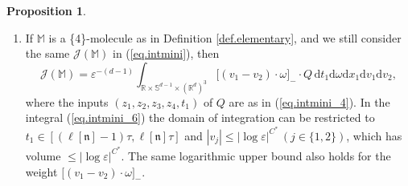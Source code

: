 \documentclass[10pt, reqno]{amsart}
\newcommand{\Mb}{\mathbb M}
\newcommand{\Rb}{\mathbb R}
\newcommand{\Sb}{\mathbb S}
\newcommand{\Tb}{\mathbb T}
\newcommand {\Jc}{\mathcal J}
\newcommand{\nf}{\mathfrak n}
\theoremstyle{definition}
\newtheorem{proposition}[theorem]{Proposition}
\theoremstyle{remark}
\numberwithin{equation}{section}
\begin{document}
\begin{proposition}
\begin{enumerate}
In addition, assume $Q$ is supported in some set depending on some external parameters $(x^*,t^*)$, and the support satisfies
\begin{equation}\label{eq.intmini_new}\min(|x_i-x_j|_\Tb,|v_i-v_j|)\leq\lambda\quad\mathrm{or}\quad \min(|t_1-t^*|,|v_j-v^*|,|x_j-x^*|_\Tb)\leq\lambda
\end{equation} for some $\varepsilon\lesssim\lambda\lesssim 1$, where $i\neq j$ in the first case in (\ref{eq.intmini_new}) and $j\neq 1$ in the second case. Then in each case, the domain of integration in (\ref{eq.intmini_3}) can be restricted to a set of $(t_1,\omega,v_2)$ that depends on $(x_1,v_1)$ and the external parameters, which has volume $\leq \lambda\cdot|\log\varepsilon|^{C^*}$.
\item\label{it.intmini_3} If $\Mb$ is a \{4\}-molecule as in Definition \ref{def.elementary}, and we still consider the same $\Jc(\Mb)$ in (\ref{eq.intmini}), then
\begin{equation}\label{eq.intmini_6}
\Jc(\Mb)=\varepsilon^{-(d-1)}\int_{\Rb\times\Sb^{d-1}\times(\Rb^d)^3}\big[(v_1-v_2)\cdot\omega\big]_-\cdot Q\,\mathrm{d}t_1\mathrm{d}\omega\mathrm{d}x_1\mathrm{d}v_1\mathrm{d}v_2,
\end{equation} where the inputs $(z_1,z_2,z_3,z_4,t_1)$ of $Q$ are as in (\ref{eq.intmini_4}). In the integral (\ref{eq.intmini_6}) the domain of integration can be restricted to $t_1\in [(\ell[\nf]-1)\tau,\ell[\nf]\tau]$ and $|v_j|\leq|\log\varepsilon|^{C^*}\,(j\in\{1,2\})$, which has volume $\leq|\log\varepsilon|^{C^*}$. The same logarithmic upper bound also holds for the weight $\big[(v_1-v_2)\cdot\omega\big]_-$.


\end{enumerate}
\end{proposition}
\end{document}
